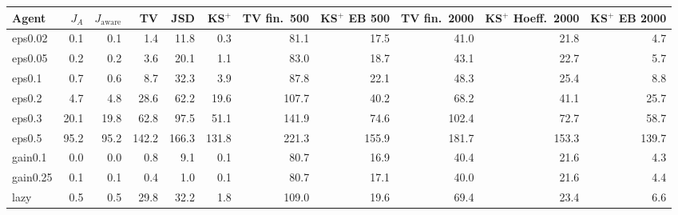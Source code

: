 \begin{tabular}{lrrrrrrrrrr}
\toprule
 Agent & $J_A$ & $J_{\mathrm{aware}}$ & TV & JSD & KS$^+$ & TV fin.\ 500 & KS$^+$ EB 500 & TV fin.\ 2000 & KS$^+$ Hoeff.\ 2000 & KS$^+$ EB 2000 \\
\midrule
eps0.02 & 0.1 & 0.1 & 1.4 & 11.8 & 0.3 & 81.1 & 17.5 & 41.0 & 21.8 & 4.7 \\
eps0.05 & 0.2 & 0.2 & 3.6 & 20.1 & 1.1 & 83.0 & 18.7 & 43.1 & 22.7 & 5.7 \\
eps0.1 & 0.7 & 0.6 & 8.7 & 32.3 & 3.9 & 87.8 & 22.1 & 48.3 & 25.4 & 8.8 \\
eps0.2 & 4.7 & 4.8 & 28.6 & 62.2 & 19.6 & 107.7 & 40.2 & 68.2 & 41.1 & 25.7 \\
eps0.3 & 20.1 & 19.8 & 62.8 & 97.5 & 51.1 & 141.9 & 74.6 & 102.4 & 72.7 & 58.7 \\
eps0.5 & 95.2 & 95.2 & 142.2 & 166.3 & 131.8 & 221.3 & 155.9 & 181.7 & 153.3 & 139.7 \\
gain0.1 & 0.0 & 0.0 & 0.8 & 9.1 & 0.1 & 80.7 & 16.9 & 40.4 & 21.6 & 4.3 \\
gain0.25 & 0.1 & 0.1 & 0.4 & 1.0 & 0.1 & 80.7 & 17.1 & 40.0 & 21.6 & 4.4 \\
lazy & 0.5 & 0.5 & 29.8 & 32.2 & 1.8 & 109.0 & 19.6 & 69.4 & 23.4 & 6.6 \\
\bottomrule
\end{tabular}